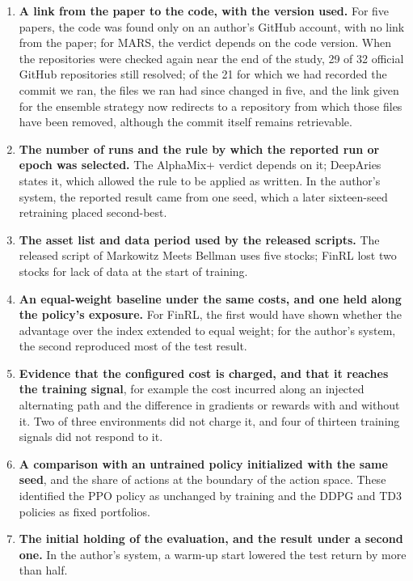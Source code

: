 \documentclass[12pt,a4paper]{report}
\providecommand{\tightlist}{\setlength{\itemsep}{0pt}\setlength{\parskip}{0pt}}
\begin{document}
\begin{enumerate}
\def\labelenumi{\arabic{enumi}.}
\tightlist
\item
  \textbf{A link from the paper to the code, with the version used.} For
  five papers, the code was found only on an author's GitHub account,
  with no link from the paper; for MARS, the verdict depends on the code
  version. When the repositories were checked again near the end of the
  study, 29 of 32 official GitHub repositories still resolved; of the 21
  for which we had recorded the commit we ran, the files we ran had
  since changed in five, and the link given for the ensemble strategy
  now redirects to a repository from which those files have been
  removed, although the commit itself remains retrievable.
\item
  \textbf{The number of runs and the rule by which the reported run or
  epoch was selected.} The AlphaMix+ verdict depends on it; DeepAries
  states it, which allowed the rule to be applied as written. In the
  author's system, the reported result came from one seed, which a later
  sixteen-seed retraining placed second-best.
\item
  \textbf{The asset list and data period used by the released scripts.}
  The released script of Markowitz Meets Bellman uses five stocks; FinRL
  lost two stocks for lack of data at the start of training.
\item
  \textbf{An equal-weight baseline under the same costs, and one held
  along the policy's exposure.} For FinRL, the first would have shown
  whether the advantage over the index extended to equal weight; for the
  author's system, the second reproduced most of the test result.
\item
  \textbf{Evidence that the configured cost is charged, and that it
  reaches the training signal}, for example the cost incurred along an
  injected alternating path and the difference in gradients or rewards
  with and without it. Two of three environments did not charge it, and
  four of thirteen training signals did not respond to it.
\item
  \textbf{A comparison with an untrained policy initialized with the
  same seed}, and the share of actions at the boundary of the action
  space. These identified the PPO policy as unchanged by training and
  the DDPG and TD3 policies as fixed portfolios.
\item
  \textbf{The initial holding of the evaluation, and the result under a
  second one.} In the author's system, a warm-up start lowered the test
  return by more than half.
\end{enumerate}
\end{document}
